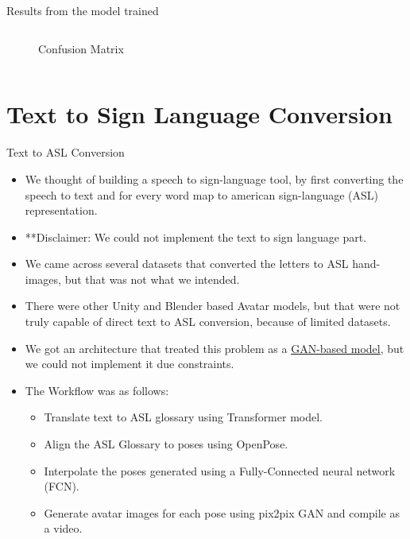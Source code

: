 \documentclass[10pt]{beamer}
\begin{document}
\begin{frame}{Results from the model trained}
\begin{columns}
\begin{column}{0.5\textwidth}
\begin{figure}
		\caption{Confusion Matrix}
	\end{figure}
	\end{column}
\end{columns}
\end{frame}

\section{Text to Sign Language Conversion}
\begin{frame}{Text to ASL Conversion}
\begin{itemize}
	\item We thought of building a speech to sign-language tool, by first converting the speech to text and for every word map to american sign-language (ASL) representation.
	\item \textcolor{red!60!white}{**Disclaimer:
{\small We could not implement the text to sign language part.}}
	\item We came across several datasets that converted the letters to ASL hand-images, but that was not what we intended.
	\item There were other Unity and Blender based Avatar models, but that were not truly capable of direct text to ASL conversion, because of limited datasets.
	\item We got an architecture that treated this problem as a \href{https://github.com/arunnair411/Speech-to-ASL}{GAN-based model}, but we could not implement  it due constraints.
	\item The Workflow was as follows:
	\begin{itemize}
		\item Translate text to ASL glossary using Transformer model.
		\item Align the ASL Glossary to poses using OpenPose.
		\item Interpolate the poses generated using a Fully-Connected neural network (FCN).
		\item Generate avatar images for each pose using pix2pix GAN and compile as a video.
	\end{itemize}
\end{itemize}
\end{frame}
\end{document}
